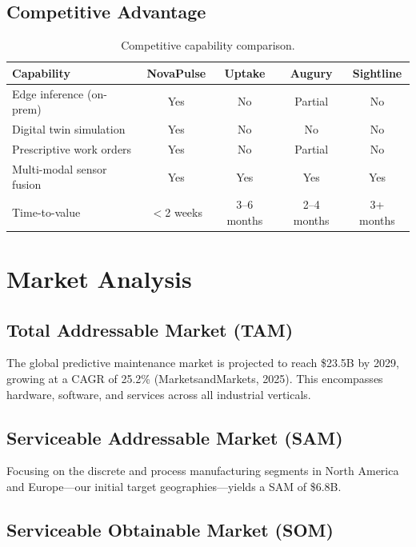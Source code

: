\documentclass[
    language=english,
    doctype=business-plan,
    institution=none,
]{../../omnilatex}
\begin{document}
\subsection{Competitive Advantage}

\begin{table}[h]
    \centering
    \begin{tabular}{lcccc}
        \toprule
        \textbf{Capability} & \textbf{NovaPulse} & \textbf{Uptake} &
        \textbf{Augury} & \textbf{Sightline} \\
        \midrule
        Edge inference (on-prem)   & Yes & No  & Partial & No  \\
        Digital twin simulation   & Yes & No  & No      & No  \\
        Prescriptive work orders  & Yes & No  & Partial & No  \\
        Multi-modal sensor fusion & Yes & Yes & Yes     & Yes \\
        Time-to-value             & $<$2 weeks & 3--6 months & 2--4 months & 3+ months \\
        \bottomrule
    \end{tabular}
    \caption{Competitive capability comparison.}
\end{table}

\section{Market Analysis}

\subsection{Total Addressable Market (TAM)}

The global predictive maintenance market is projected to reach \$23.5B by 2029,
growing at a CAGR of 25.2\% (MarketsandMarkets, 2025). This encompasses
hardware, software, and services across all industrial verticals.

\subsection{Serviceable Addressable Market (SAM)}

Focusing on the discrete and process manufacturing segments in North America
and Europe---our initial target geographies---yields a SAM of \$6.8B.

\subsection{Serviceable Obtainable Market (SOM)}
\end{document}
